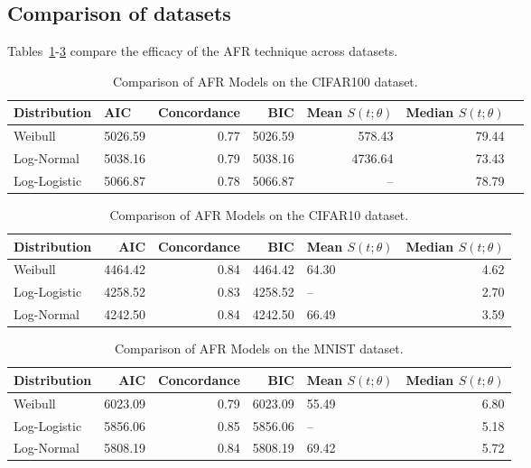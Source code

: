 \subsection{Comparison of datasets}
Tables~\ref{tab:cifar100}-\ref{tab:mnist} compare the efficacy of the AFR technique across datasets.

\begin{table}[h!]
\centering
\caption{Comparison of AFR Models on the CIFAR100 dataset.}
\label{tab:cifar100}
\begin{tabular}{llrrrrr}
\toprule
Distribution &     AIC &  Concordance &     BIC &  Mean  $S(t; \theta)$ &  Median $S(t; \theta)$ \\
\midrule
Weibull & 5026.59 &         0.77 & 5026.59 &              578.43 &                 79.44 \\
Log-Normal & 5038.16 &         0.79 & 5038.16 &             4736.64 &                 73.43 \\
Log-Logistic & 5066.87 &         0.78 & 5066.87 &                 -- &                 78.79 \\
\bottomrule
\end{tabular}
\end{table}


\begin{table}[h!]
\centering
\caption{Comparison of AFR Models on the CIFAR10 dataset.}
\label{tab:cifar}
\begin{tabular}{lrrrlr}
\toprule
Distribution & AIC & Concordance & BIC & Mean $S(t;\theta)$ & Median $S(t;\theta)$ \\
\midrule
Weibull & 4464.42 & 0.84 & 4464.42 & 64.30 & 4.62 \\
Log-Logistic & 4258.52 & 0.83 & 4258.52 & -- & 2.70 \\
Log-Normal & 4242.50 & 0.84 & 4242.50 & 66.49 & 3.59 \\
\bottomrule
\end{tabular}
\end{table}


\begin{table}[h!]
\centering
\caption{Comparison of AFR Models on the MNIST dataset.}
\label{tab:mnist}
\begin{tabular}{lrrrlr}
\toprule
Distribution & AIC & Concordance & BIC & Mean $S(t;\theta)$ & Median $S(t;\theta)$ \\
\midrule
Weibull & 6023.09 & 0.79 & 6023.09 & 55.49 & 6.80 \\
Log-Logistic & 5856.06 & 0.85 & 5856.06 & -- & 5.18 \\
Log-Normal & 5808.19 & 0.84 & 5808.19 & 69.42 & 5.72 \\
\bottomrule
\end{tabular}
\end{table}
